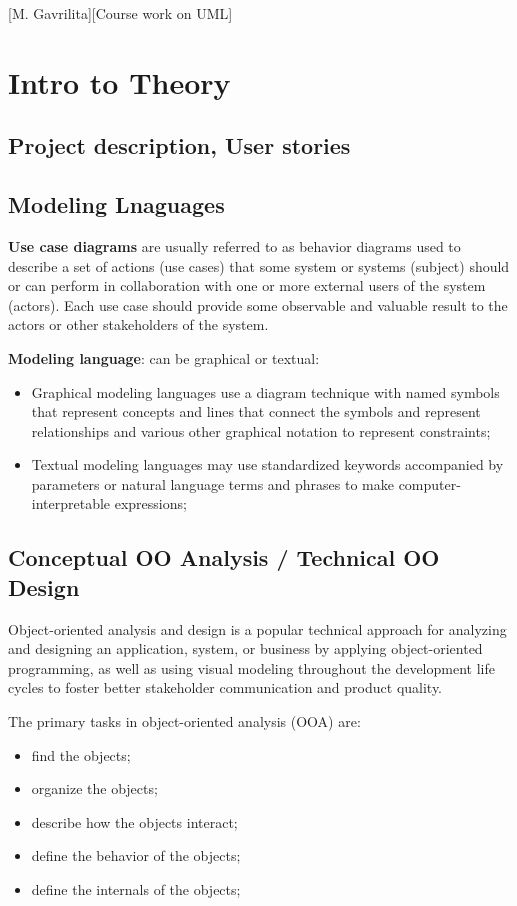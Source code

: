 \documentclass{article}
\begin{document}
	[M. Gavrilita][Course work on UML]

	\section{Intro to Theory}
		\subsection{Project description, User stories}
		\subsection{Modeling Lnaguages}
			\textbf{Use case diagrams} are usually referred to as behavior diagrams used to describe a set of actions (use cases) that some system or systems (subject) should or can perform in collaboration with one or more external users of the system (actors). Each use case should provide some observable and valuable result to the actors or other stakeholders of the system.

			\bigskip
			\textbf{Modeling language}: can be graphical or textual:
			\begin{itemize}
				\item Graphical modeling languages use a diagram technique with named symbols that represent concepts and lines that connect the symbols and represent relationships and various other graphical notation to represent constraints;
				\item Textual modeling languages may use standardized keywords accompanied by parameters or natural language terms and phrases to make computer-interpretable expressions;
			\end{itemize}

		\subsection{Conceptual OO Analysis / Technical OO Design}
			Object-oriented analysis and design is a popular technical approach for analyzing and designing an application, system, or business by applying object-oriented programming, as well as using visual modeling throughout the development life cycles to foster better stakeholder communication and product quality.

			The primary tasks in object-oriented analysis (OOA) are:
			\begin{itemize}
				\item find the objects;
				\item organize the objects;
				\item describe how the objects interact;
				\item define the behavior of the objects;
				\item define the internals of the objects;
			\end{itemize}
\end{document}
